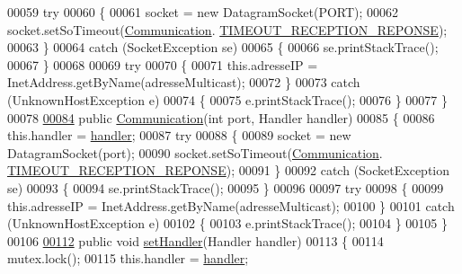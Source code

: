 \begin{DoxyCode}
00059         \textcolor{keywordflow}{try}
00060         \{
00061             socket = \textcolor{keyword}{new} DatagramSocket(PORT);
00062             socket.setSoTimeout(\hyperlink{classcom_1_1lasalle_1_1meeting_1_1_communication}{Communication}.
      \hyperlink{classcom_1_1lasalle_1_1meeting_1_1_communication_a7cbfa2bdd8c4978f96abd43740050fe0}{TIMEOUT\_RECEPTION\_REPONSE});
00063         \}
00064         \textcolor{keywordflow}{catch} (SocketException se)
00065         \{
00066             se.printStackTrace();
00067         \}
00068 
00069         \textcolor{keywordflow}{try}
00070         \{
00071             this.adresseIP = InetAddress.getByName(adresseMulticast);
00072         \}
00073         \textcolor{keywordflow}{catch} (UnknownHostException e)
00074         \{
00075             e.printStackTrace();
00076         \}
00077     \}
00078 
\hyperlink{classcom_1_1lasalle_1_1meeting_1_1_communication_a38c93366f750b357d248572d85577d8f}{00084}     \textcolor{keyword}{public} \hyperlink{classcom_1_1lasalle_1_1meeting_1_1_communication_a38c93366f750b357d248572d85577d8f}{Communication}(\textcolor{keywordtype}{int} port, Handler handler)
00085     \{
00086         this.handler = \hyperlink{classcom_1_1lasalle_1_1meeting_1_1_communication_a05fa5f360f28819a9e106e0265a74643}{handler};
00087         \textcolor{keywordflow}{try}
00088         \{
00089             socket = \textcolor{keyword}{new} DatagramSocket(port);
00090             socket.setSoTimeout(\hyperlink{classcom_1_1lasalle_1_1meeting_1_1_communication}{Communication}.
      \hyperlink{classcom_1_1lasalle_1_1meeting_1_1_communication_a7cbfa2bdd8c4978f96abd43740050fe0}{TIMEOUT\_RECEPTION\_REPONSE});
00091         \}
00092         \textcolor{keywordflow}{catch} (SocketException se)
00093         \{
00094             se.printStackTrace();
00095         \}
00096 
00097         \textcolor{keywordflow}{try}
00098         \{
00099             this.adresseIP = InetAddress.getByName(adresseMulticast);
00100         \}
00101         \textcolor{keywordflow}{catch} (UnknownHostException e)
00102         \{
00103             e.printStackTrace();
00104         \}
00105     \}
00106 
\hyperlink{classcom_1_1lasalle_1_1meeting_1_1_communication_a872d98a1793108557acccd0e695892af}{00112}     \textcolor{keyword}{public} \textcolor{keywordtype}{void} \hyperlink{classcom_1_1lasalle_1_1meeting_1_1_communication_a872d98a1793108557acccd0e695892af}{setHandler}(Handler handler)
00113     \{
00114         mutex.lock();
00115         this.handler = \hyperlink{classcom_1_1lasalle_1_1meeting_1_1_communication_a05fa5f360f28819a9e106e0265a74643}{handler};

\end{DoxyCode}
